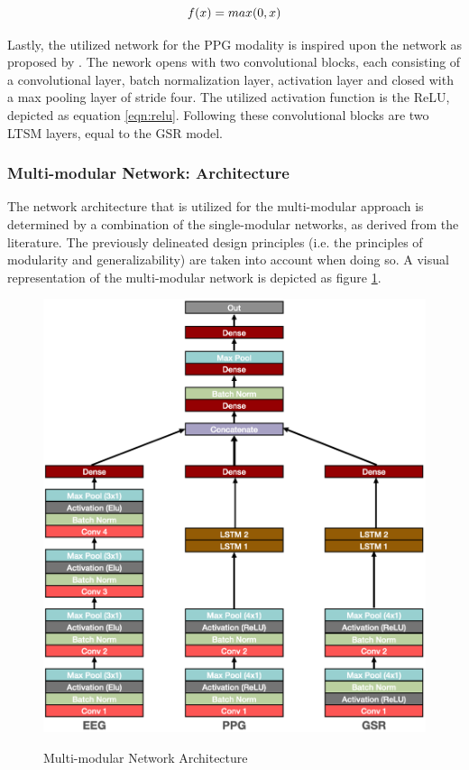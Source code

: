 \documentclass[12pt]{article}
\begin{document}
\begin{equation} 
\label{eqn:relu}
f(x)=max(0,x)
\bigskip
\end{equation}

Lastly, the utilized network for the PPG modality is inspired upon the network as proposed by . The nework opens with two convolutional blocks, each consisting of a convolutional layer, batch normalization layer, activation layer and closed with a max pooling layer of stride four. The utilized activation function is the ReLU, depicted as equation \ref{eqn:relu}. Following these convolutional blocks are two LTSM layers, equal to the GSR model. 

\subsubsection{Multi-modular Network: Architecture}
The network architecture that is utilized for the multi-modular approach is determined by a combination of the single-modular networks, as derived from the literature. The previously delineated design principles (i.e. the principles of modularity and generalizability) are taken into account when doing so. A visual representation of the multi-modular network is depicted as figure \ref{fig:multiarchitecture}.

\begin{figure}
\caption{Multi-modular Network Architecture}
\bigskip
\includegraphics[scale=0.725]{multi_model_architecture}
\label{fig:multiarchitecture}
\end{figure}
\end{document}
